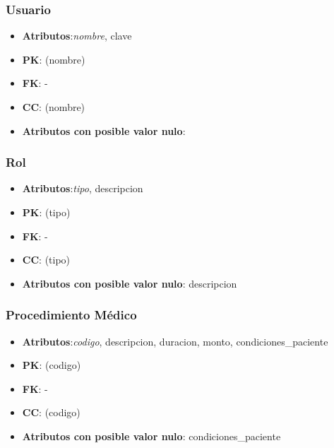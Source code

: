 \documentclass[a4paper,11pt]{article}
\begin{document}
\subsubsection{\textbf{Usuario}}

\begin{itemize}

\item 
\textbf{Atributos}:\emph{nombre}, clave

\item 
\textbf{PK}: (nombre)

\item
\textbf{FK}: - 

\item 
\textbf{CC}: (nombre)

\item 
\textbf{Atributos con posible valor nulo}: 
\end{itemize}
\subsubsection{\textbf{Rol}}

\begin{itemize}

\item 
\textbf{Atributos}:\emph{tipo}, descripcion

\item 
\textbf{PK}: (tipo)

\item
\textbf{FK}: - 

\item 
\textbf{CC}: (tipo)

\item 
\textbf{Atributos con posible valor nulo}: descripcion

\end{itemize}

\subsubsection{\textbf{Procedimiento Médico}}

\begin{itemize}

\item 
\textbf{Atributos}:\emph{codigo}, descripcion, duracion, monto, condiciones\_paciente

\item 
\textbf{PK}: (codigo)

\item
\textbf{FK}: - 

\item 
\textbf{CC}: (codigo)

\item 
\textbf{Atributos con posible valor nulo}: condiciones\_paciente

\end{itemize}
\end{document}
